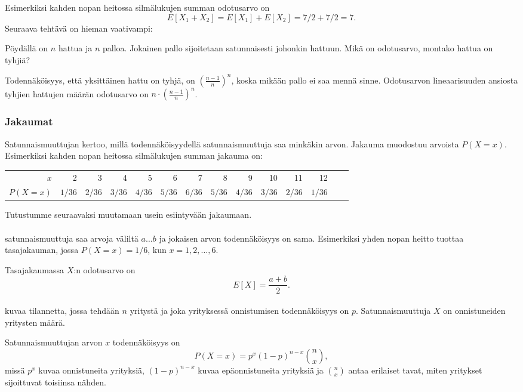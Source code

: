 Esimerkiksi kahden nopan heitossa silmälukujen summan odotusarvo on
\[E[X_1+X_2]=E[X_1]+E[X_2]=7/2+7/2=7.\]
Seuraava tehtävä on hieman vaativampi:

\begin{task}
Pöydällä on $n$ hattua ja $n$ palloa.
Jokainen pallo sijoitetaan satunnaisesti johonkin hattuun.
Mikä on odotusarvo, montako hattua on tyhjiä?
\end{task}

Todennäköisyys, että yksittäinen hattu on tyhjä,
on $(\frac{n-1}{n})^n$, koska mikään pallo ei saa mennä sinne.
Odotusarvon lineaarisuuden ansiosta tyhjien hattujen
määrän odotusarvo on $n \cdot (\frac{n-1}{n})^n$.

\subsubsection{Jakaumat}


Satunnaismuuttujan  kertoo,
millä todennäköisyydellä satunnaismuuttuja
saa minkäkin arvon.
Jakauma muodostuu arvoista $P(X=x)$.
Esimerkiksi kahden nopan heitossa
silmälukujen summan jakauma on:
\begin{center}
\small {
\begin{tabular}{r|rrrrrrrrrrrrr}
$x$ & 2 & 3 & 4 & 5 & 6 & 7 & 8 & 9 & 10 & 11 & 12 \\
$P(X=x)$ & $1/36$ & $2/36$ & $3/36$ & $4/36$ & $5/36$ & $6/36$ & $5/36$ & $4/36$ & $3/36$ & $2/36$ & $1/36$ \\
\end{tabular}
}
\end{center}
Tutustumme seuraavaksi muutamaan usein esiintyvään jakaumaan.
~\\\\
 satunnaismuuttuja
saa arvoja väliltä $a \ldots b$
ja jokaisen arvon todennäköisyys on sama.
Esimerkiksi yhden nopan heitto tuottaa tasajakauman,
jossa $P(X=x)=1/6$, kun $x=1,2,\ldots,6$.

Tasajakaumassa $X$:n odotusarvo on
\[E[X] = \frac{a+b}{2}.\]
~\\
 kuvaa tilannetta, jossa tehdään $n$
yritystä ja joka yrityksessä onnistumisen
todennäköisyys on $p$. Satunnaismuuttuja $X$
on onnistuneiden yritysten määrä.

Satunnaismuuttujan arvon $x$ todennäköisyys on
\[P(X=x)=p^x (1-p)^{n-x} {n \choose x},\]
missä $p^x$ kuvaa onnistuneita yrityksiä,
$(1-p)^{n-x}$ kuvaa epäonnistuneita yrityksiä
ja ${n \choose x}$ antaa erilaiset tavat,
miten yritykset sijoittuvat toisiinsa nähden.


